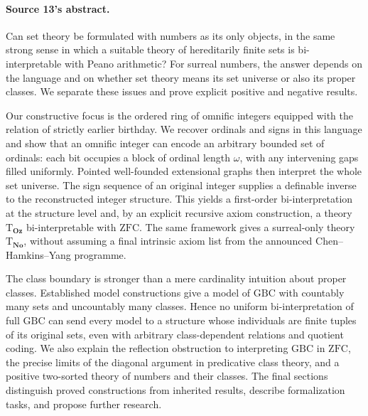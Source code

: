 \documentclass[11pt,letterpaper]{article}
\theoremstyle{definition}
\theoremstyle{remark}
\newcommand{\No}{\mathbf{No}}
\newcommand{\ZFC}{\mathrm{ZFC}}
\newcommand{\Oz}{\mathbf{Oz}}
\newcommand{\GBC}{\mathrm{GBC}}
\newcommand{\Tth}{\mathrm{T}}
\begin{document}
\paragraph{Source 13's abstract.} Can set theory be formulated with numbers as
its only objects, in the same strong sense in which a suitable theory of
hereditarily finite sets is bi-interpretable with Peano arithmetic? For surreal
numbers, the answer depends on the language and on whether set theory means its
set universe or also its proper classes. We separate these issues and prove
explicit positive and negative results.

Our constructive focus is the ordered ring of omnific integers equipped with the
relation of strictly earlier birthday. We recover ordinals and signs in this
language and show that an omnific integer can encode an arbitrary bounded set of
ordinals: each bit occupies a block of ordinal length $\omega$, with any
intervening gaps filled uniformly. Pointed well-founded extensional graphs then
interpret the whole set universe. The sign sequence of an original integer
supplies a definable inverse to the reconstructed integer structure. This yields
a first-order bi-interpretation at the structure level and, by an explicit
recursive axiom construction, a theory $\Tth_{\Oz}$ bi-interpretable with
$\ZFC$. The same framework gives a surreal-only theory $\Tth_{\No}$, without
assuming a final intrinsic axiom list from the announced Chen--Hamkins--Yang
programme.

The class boundary is stronger than a mere cardinality intuition about proper
classes. Established model constructions give a model of $\GBC$ with countably
many sets and uncountably many classes. Hence no uniform bi-interpretation of
full $\GBC$ can send every model to a structure whose individuals are finite
tuples of its original sets, even with arbitrary class-dependent relations and
quotient coding. We also explain the reflection obstruction to interpreting
$\GBC$ in $\ZFC$, the precise limits of the diagonal argument in predicative
class theory, and a positive two-sorted theory of numbers and their classes. The
final sections distinguish proved constructions from inherited results, describe
formalization tasks, and propose further research.
\end{document}
